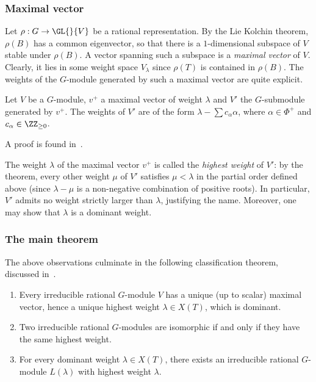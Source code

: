 \subsubsection{Maximal vector}

Let $\rho : G \rightarrow \GL{}{V}$ be a rational representation. By the Lie Kolchin theorem, $\rho(B)$ has a common eigenvector, so that there is a $1$-dimensional subspace of $V$ stable under $\rho(B)$. A vector spanning such a subspace is a \emph{maximal vector} of $V$. Clearly, it lies in some weight space $V_\lambda$ since $\rho(T)$ is contained in $\rho(B)$. The weights of the $G$-module generated by such a maximal vector are quite explicit.
\begin{theorem}
    Let $V$ be a $G$-module, $v^+$ a maximal vector of weight $\lambda$ and $V'$ the $G$-submodule generated by $v^+$. The weights of $V'$ are of the form $\lambda - \sum c_{\alpha} \alpha$, where $\alpha \in \Phi^+$ and $c_\alpha \in \ZZ_{\geq0}$.
\end{theorem}
A proof is found in~\cite[Section~31.2]{humphreys_linear_1975}.

The weight $\lambda$ of the maximal vector $v^+$ is called the \emph{highest weight} of $V'$: by the theorem, every other weight $\mu$ of $V'$ satisfies $\mu < \lambda$ in the partial order defined above (since $\lambda - \mu$ is a non-negative combination of positive roots). In particular, $V'$ admits no weight strictly larger than $\lambda$, justifying the name. Moreover, one may show that $\lambda$ is a dominant weight.

\subsubsection{The main theorem}

The above observations culminate in the following classification theorem, discussed in~\cite[Sections~31.2-31.4]{humphreys_linear_1975}.

\begin{theorem}
    \hfill
    \begin{enumerate}
        \item Every irreducible rational $G$-module $V$ has a unique (up to scalar) maximal vector, hence a unique highest weight $\lambda \in X(T)$, which is dominant.
        \item Two irreducible rational $G$-modules are isomorphic if and only if they have the same highest weight.
        \item For every dominant weight $\lambda \in X(T)$, there exists an irreducible rational $G$-module $L(\lambda)$ with highest weight $\lambda$.
    \end{enumerate}
\end{theorem}


